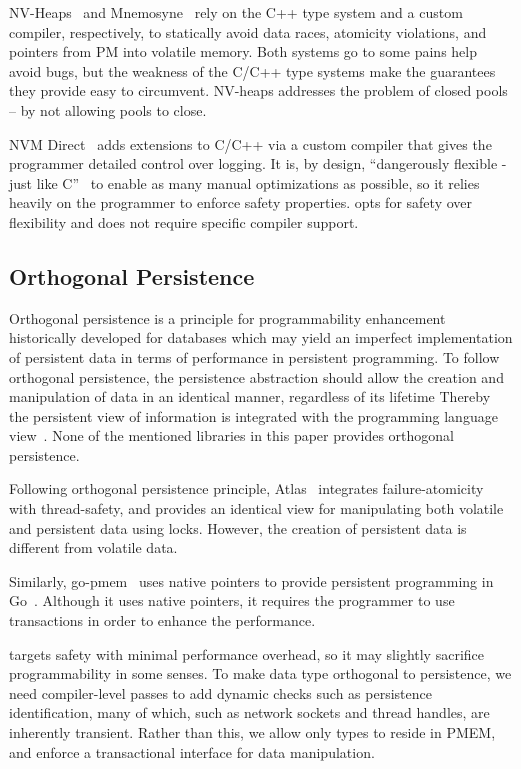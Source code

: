 NV-Heaps~\cite{nvheaps} and Mnemosyne~\cite{mnemosyne} rely on the C++ type system and a custom compiler, respectively, to statically avoid data races, atomicity violations, and pointers from PM into volatile memory.  Both systems go to some pains help avoid bugs, but the weakness of the C/C++ type systems make the guarantees they provide easy to circumvent.  NV-heaps addresses the problem of closed pools -- by not allowing pools to close.

NVM Direct~\cite{oracle-nvm-direct} adds extensions to C/C++ via a custom compiler that gives the programmer detailed control over logging.  It is, by design, ``dangerously flexible - just like C''~\cite{personalbillbridge} to enable as many manual optimizations as possible, so it relies heavily on the programmer to enforce safety properties.  \This{} opts for safety over flexibility and does not require specific compiler support.

\subsection{Orthogonal Persistence}

Orthogonal persistence is a principle for programmability enhancement historically developed for databases which may yield an imperfect implementation of persistent data in terms of performance in persistent programming. To follow orthogonal persistence, the persistence abstraction should allow the creation and manipulation of data in an identical manner, regardless of its lifetime Thereby the persistent view of information is integrated with the programming language view~\cite{atkinson1995orthogonally}. 
None of the mentioned libraries in this paper provides orthogonal persistence.

Following orthogonal persistence principle, Atlas~\cite{atlas} integrates failure-atomicity with thread-safety, and provides an identical view for manipulating both volatile and persistent data using locks. However, the creation of persistent data is different from volatile data.

Similarly, go-pmem~\cite{gopmem} uses native pointers to provide persistent programming in Go~\cite{golang}. Although it uses native pointers, it requires the programmer to use transactions in order to enhance the performance.

\This{} targets safety with minimal performance overhead, so it may slightly sacrifice programmability in some senses. To make data type orthogonal to persistence, we need compiler-level passes to add dynamic checks such as persistence identification, many of which, such as network sockets and thread handles, are inherently transient. Rather than this, we allow only  types to reside in PMEM, and enforce a transactional interface for data manipulation.


